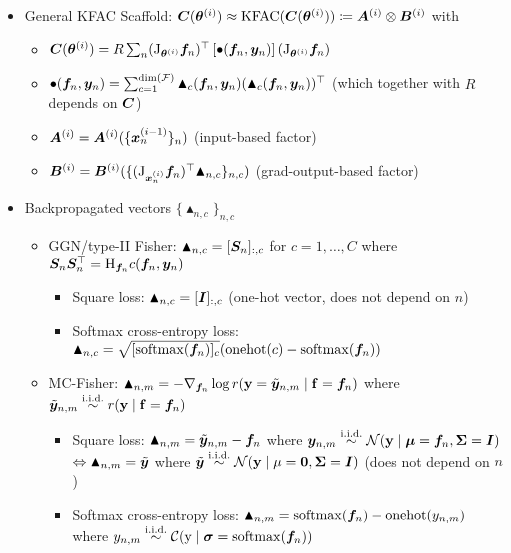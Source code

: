 \begin{itemize}
  \item General KFAC Scaffold: \qquad
    $
    {\bm{C}}({\bm{\theta}}^{(i)})
    \approx
    \mathrm{KFAC}({\bm{C}}({\bm{\theta}}^{(i)}))
    \coloneqq {\bm{A}}^{(i)} \otimes {\bm{B}}^{(i)}
    $
  \quad with
  \begin{itemize}
    \item ${\bm{C}}({\bm{\theta}}^{(i)})
    = R \sum_n
    (\mathrm{J}_{{\bm{\theta}}^{(i)}} {\bm{f}}_n)^{\top}
    \left[ \bullet({\bm{f}}_n, {\bm{y}}_n) \right]
    (\mathrm{J}_{{\bm{\theta}}^{(i)}} {\bm{f}}_n)$
    \item $\bullet({\bm{f}}_n, {\bm{y}}_n) = \sum_{c=1}^{\dim({\mathcal{F}})} \blacktriangle_c({\bm{f}}_n, {\bm{y}}_n) (\blacktriangle_c({\bm{f}}_n, {\bm{y}}_n))^{\top}$ \quad (which together with $R$ depends on ${\bm{C}}$)
    \item ${\bm{A}}^{(i)} = {\bm{A}}^{(i)}( \{{\bm{x}}_{n}^{(i-1)}\}_n )$ \quad (input-based factor)
    \item ${\bm{B}}^{(i)} = {\bm{B}}^{(i)}( \{ (\mathrm{J}_{{\bm{x}}_n^{(i)}}{\bm{f}}_{n})^{\top} \blacktriangle_{n,c}\}_{n,c})$ \quad (grad-output-based factor)
  \end{itemize}
  \item Backpropagated vectors $\{ \blacktriangle_{n,c} \}_{n,c}$
    \begin{itemize}
    \item GGN/type-II Fisher: $\blacktriangle_{n,c} = [{\bm{S}}_n]_{:,c}$ for $c = 1, \dots, C$ where ${\bm{S}}_n {\bm{S}}_n^{\top} = \mathrm{H}_{{\bm{f}}_n} c({\bm{f}}_n, {\bm{y}}_n)$
      \begin{itemize}
      \item Square loss: $\blacktriangle_{n,c} = [{\bm{I}}]_{:,c}$  (one-hot vector, does not depend on $n$)
      \item Softmax cross-entropy loss: $\blacktriangle_{n,c} =  \sqrt{[\mathrm{softmax}({\bm{f}}_n)]_c} (\mathrm{onehot}(c) - \mathrm{softmax}({\bm{f}}_n))$
      \end{itemize}

    \item MC-Fisher: $\blacktriangle_{n,m} = - \nabla_{{\bm{f}}_n} \log r({\mathbf{y}} = \tilde{{\bm{y}}}_{n,m} \mid {\mathbf{f}} = {\bm{f}}_n)$ where $\tilde{\vy}_{n,m} \stackrel{\text{\iid}}{\sim} r(\rvy \mid \rvf = \vf_n)$
      \begin{itemize}
      \item Square loss: $\blacktriangle_{n,m} = \tilde{{\bm{y}}}_{n,m} - {\bm{f}}_n$ where $\vy_{n,m} \stackrel{\text{\iid}}{\sim} \gN(\rvy \mid \vmu = \vf_n, \mSigma = \mI)$\\
        $\Leftrightarrow \blacktriangle_{n,m} = \tilde{{\bm{y}}}$ where $\tilde{\vy} \stackrel{\text{\iid}}{\sim} \gN(\rvy \mid \mu = \vzero, \mSigma = \mI)$ (does not depend on $n$)
        \item Softmax cross-entropy loss: $\blacktriangle_{n,m} = \mathrm{softmax}({\bm{f}}_n) - \mathrm{onehot}(y_{n,m})$ where $y_{n,m} \stackrel{\text{\iid}}{\sim} \gC(\ry \mid \vsigma = \softmax(\vf_n))$
      \end{itemize}


\end{itemize}
\end{itemize}
